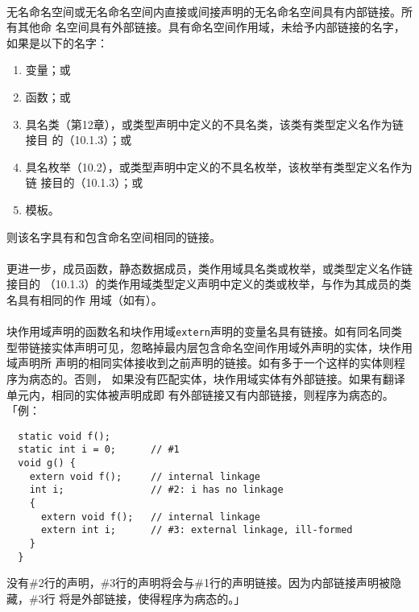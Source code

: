 \paragraph{}
无名命名空间或无名命名空间内直接或间接声明的无名命名空间具有内部链接。所有其他命
名空间具有外部链接。具有命名空间作用域，未给予内部链接的名字，如果是以下的名字：
\begin{enumerate}
  \item{变量；或}
  \item{函数；或}
  \item{具名类（第12章），或类型声明中定义的不具名类，该类有类型定义名作为链接目
    的（10.1.3）；或}
  \item{具名枚举（10.2），或类型声明中定义的不具名枚举，该枚举有类型定义名作为链
    接目的（10.1.3）；或}
  \item{模板。}
\end{enumerate}则该名字具有和包含命名空间相同的链接。

\paragraph{}
更进一步，成员函数，静态数据成员，类作用域具名类或枚举，或类型定义名作链接目的
（10.1.3）的类作用域类型定义声明中定义的类或枚举，与作为其成员的类名具有相同的作
用域（如有）。

\paragraph{}
块作用域声明的函数名和块作用域\texttt{extern}声明的变量名具有链接。如有同名同类
型带链接实体声明可见，忽略掉最内层包含命名空间作用域外声明的实体，块作用域声明所
声明的相同实体接收到之前声明的链接。如有多于一个这样的实体则程序为病态的。否则，
如果没有匹配实体，块作用域实体有外部链接。如果有翻译单元内，相同的实体被声明成即
有外部链接又有内部链接，则程序为病态的。「例：
\begin{lstlisting}
  static void f();
  static int i = 0;      // #1
  void g() {
    extern void f();     // internal linkage
    int i;               // #2: i has no linkage
    {
      extern void f();   // internal linkage
      extern int i;      // #3: external linkage, ill-formed
    }
  }
\end{lstlisting}
没有\#2行的声明，\#3行的声明将会与\#1行的声明链接。因为内部链接声明被隐藏，\#3行
将是外部链接，使得程序为病态的。」


